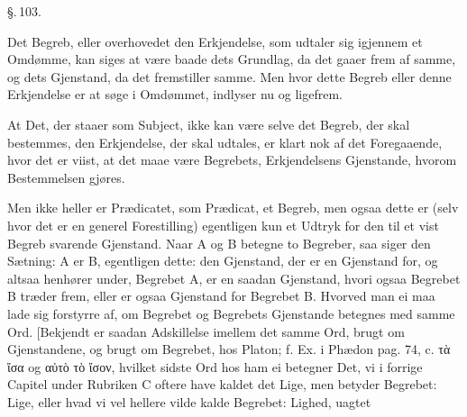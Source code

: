 \documentclass[12pt]{book}
\def\textit#1{#1}%
\def\emph#1{#1}%
\newcommand{\parag}[1]{%
  \par\vspace{0.9\baselineskip}%
  {\centering\textit{\S.\,#1.}\par}%
  \vspace{0.35\baselineskip}%
  \noindent\hspace{\parindent}\ignorespaces
}
\newcommand{\opage}[1]{\marginnote{\footnotesize\textit{[#1]}}}
\begin{document}
\parag{103}

Det Begreb, eller overhovedet den Erkjendelse, som udtaler sig igjennem et Omdømme,
\opage{252} kan siges at være baade dets Grundlag, da det gaaer frem af samme, og dets Gjenstand,
da det fremstiller samme. Men hvor dette Begreb eller denne Erkjendelse er at søge i
Omdømmet, indlyser nu og ligefrem.

At Det, der staaer som \emph{Subject}, ikke kan være selve det Begreb, der skal
bestemmes, den Erkjendelse, der skal udtales, er klart nok af det Foregaaende, hvor det
er viist, at det maae være Begrebets, Erkjendelsens Gjenstande, hvorom Bestemmelsen
gjøres.

Men ikke heller er \emph{Prædicatet}, som \emph{Prædicat}, et Begreb, men ogsaa dette er
(selv hvor det er en generel Forestilling) egentligen kun et Udtryk for den til et vist
Begreb svarende Gjenstand. Naar \textit{A} og \textit{B} betegne to Begreber, saa siger
den Sætning: \textit{A} er \textit{B}, egentligen dette: den Gjenstand, der er en
Gjenstand for, og altsaa henhører under, Begrebet \textit{A}, er en saadan Gjenstand,
hvori ogsaa Begrebet \textit{B} træder frem, eller er ogsaa Gjenstand for Begrebet
\textit{B}. Hvorved man ei maa lade sig forstyrre af, om Begrebet og Begrebets
Gjenstande betegnes med samme Ord. [Bekjendt er saadan Adskillelse imellem det samme
Ord, brugt om Gjenstandene, og brugt om Begrebet, hos Platon; f. Ex. i Phædon pag. 74,
c. \textit{τὰ ἴσα} og \textit{αὐτὸ τὸ ἴσον}, hvilket sidste Ord hos ham ei betegner Det,
vi i forrige Capitel under Rubriken \textit{C} oftere have kaldet det Lige, men betyder
Begrebet: Lige, eller hvad vi vel hellere vilde kalde Begrebet: Lighed, uagtet
\end{document}
